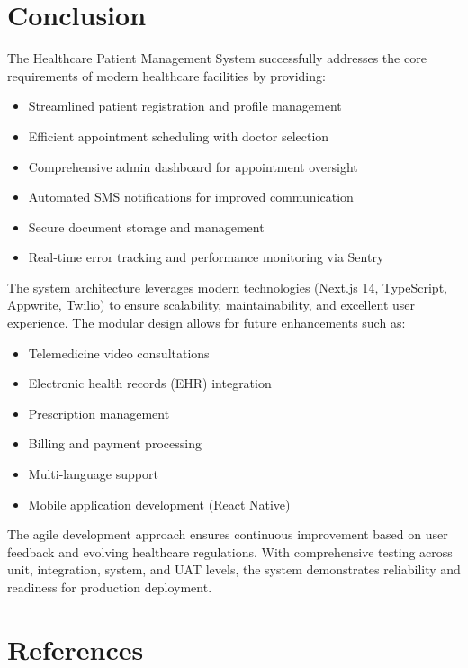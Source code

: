 \documentclass[11pt,a4paper]{article}
\begin{document}
\section{Conclusion}

The Healthcare Patient Management System successfully addresses the core requirements of modern healthcare facilities by providing:

\begin{itemize}
    \item Streamlined patient registration and profile management
    \item Efficient appointment scheduling with doctor selection
    \item Comprehensive admin dashboard for appointment oversight
    \item Automated SMS notifications for improved communication
    \item Secure document storage and management
    \item Real-time error tracking and performance monitoring via Sentry
\end{itemize}

The system architecture leverages modern technologies (Next.js 14, TypeScript, Appwrite, Twilio) to ensure scalability, maintainability, and excellent user experience. The modular design allows for future enhancements such as:

\begin{itemize}
    \item Telemedicine video consultations
    \item Electronic health records (EHR) integration
    \item Prescription management
    \item Billing and payment processing
    \item Multi-language support
    \item Mobile application development (React Native)
\end{itemize}

The agile development approach ensures continuous improvement based on user feedback and evolving healthcare regulations. With comprehensive testing across unit, integration, system, and UAT levels, the system demonstrates reliability and readiness for production deployment.

\newpage
\section{References}
\end{document}
